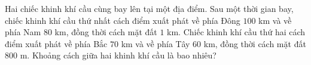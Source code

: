 \begin{ex}
Hai chiếc khinh khí cầu cùng bay lên tại một địa điểm. Sau một thời gian bay, chiếc khinh khí cầu thứ nhất cách điểm xuất phát về phía Đông $100$ km và về phía Nam $80$ km, đồng thời cách mặt đất $1$ km. Chiếc khinh khí cầu thứ hai cách điểm xuất phát về phía Bắc $70$ km và về phía Tây $60$ km, đồng thời cách mặt đất $800$ m. Khoảng cách giữa hai khinh khí cầu là bao nhiêu?
\end{ex}
